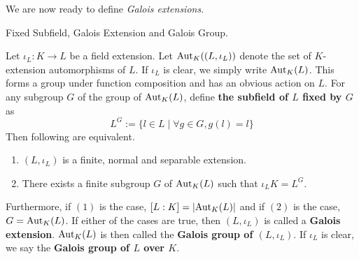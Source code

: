 \documentclass[../book.tex]{subfiles}
\begin{document}
We are now ready to define \emph{Galois extensions}. 

\begin{dfn} Fixed Subfield, Galois Extension and Galois Group.

    Let $\iota_L : K \to L$ be a field extension.
    Let $\text{Aut}_{K}((L,\iota_L))$ denote the set of $K$-extension automorphisms of $L$.
    If $\iota_L$ is clear, we simply write $\text{Aut}_{K}(L)$. 
    This forms a group under function composition and has an obvious action on $L$. 
    For any subgroup $G$ of the group of $\text{Aut}_{K}(L)$, 
    define \textbf{the subfield of $L$ fixed by $G$} as
    \[ L^G := \{l \in L \mid \forall g \in G, g(l)=l\} \]
    Then following are equivalent.
    \begin{enumerate}
        \item $(L,\iota_L)$ is a finite, normal and separable extension.
        \item There exists a finite subgroup $G$ of $\text{Aut}_{K}(L)$ such that
        $\iota_L K = L^G$. 
    \end{enumerate} 
    Furthermore, if $(1)$ is the case, $[L : K] = |\text{Aut}_{K}(L)|$ 
    and if $(2)$ is the case, $G = \text{Aut}_{K}(L)$.
    If either of the cases are true,
    then $(L,\iota_L)$ is called a \textbf{Galois extension}.
    $\text{Aut}_{K}(L)$ is then called the \textbf{Galois group of $(L,\iota_L)$}.
    If $\iota_L$ is clear, we say the \textbf{Galois group of $L$ over $K$}. 
\end{dfn}
\end{document}
